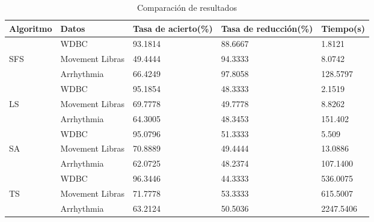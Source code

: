 \begin{table}[H]
	\centering
	\begin{tabular}{l|l|lll}
		Algoritmo	& Datos				& Tasa de acierto(\%)	& Tasa de reducción(\%)	& Tiempo(s)	\\ \hline
					& WDBC				& 93.1814				& 88.6667				& 1.8121	\\ \cline{2-5}
		SFS			& Movement Libras	& 49.4444				& 94.3333				& 8.0742	\\ \cline{2-5}
					& Arrhythmia		& 66.4249				& 97.8058				& 128.5797 	\\ \hline
					& WDBC				& 95.1854				& 48.3333				& 2.1519	\\ \cline{2-5}
		LS    		& Movement Libras	& 69.7778				& 49.7778				& 8.8262   	\\ \cline{2-5}
					& Arrhythmia		& 64.3005				& 48.3453				& 151.402  	\\ \hline
					& WDBC				& 95.0796				& 51.3333				& 5.509    	\\ \cline{2-5}
		SA			& Movement Libras	& 70.8889				& 49.4444				& 13.0886  	\\ \cline{2-5}
					& Arrhythmia		& 62.0725				& 48.2374				& 107.1400	\\ \hline
			        & WDBC				& 96.3446				& 44.3333				& 536.0075	\\ \cline{2-5}
		TS			& Movement Libras	& 71.7778				& 53.3333				& 615.5007 	\\ \cline{2-5}
					& Arrhythmia		& 63.2124				& 50.5036				& 2247.5406
		
	\end{tabular}
	\caption{Comparación de resultados}
	\label{Compare}
\end{table}